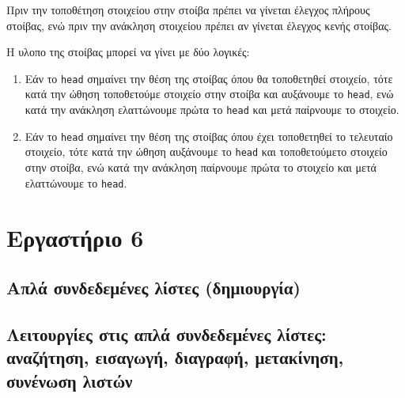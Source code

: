 \documentclass[14pt, fleqn, leqno]{extreport}
\begin{document}
Πριν την τοποθέτηση στοιχείου στην στοίβα πρέπει να γίνεται έλεγχος πλήρους στοίβας, ενώ πριν την ανάκληση στοιχείου πρέπει αν γίνεται έλεγχος κενής στοίβας.

Η υλοπο της στοίβας μπορεί να γίνει με δύο λογικές:
\begin{enumerate}
    \item Εάν το \lstinline{head} σημαίνει την θέση της στοίβας όπου θα τοποθετηθεί στοιχείο, τότε κατά την ώθηση τοποθετούμε στοιχείο στην στοίβα και αυξάνουμε το \lstinline{head}, ενώ κατά την ανάκληση ελαττώνουμε πρώτα το \lstinline{head} και μετά παίρνουμε το στοιχείο.
    \item Εάν το \lstinline{head} σημαίνει την θέση της στοίβας όπου έχει τοποθετηθεί το τελευταίο στοιχείο, τότε κατά την ώθηση αυξάνουμε το \lstinline{head} και τοποθετούμετο στοιχείο στην στοίβα, ενώ κατά την ανάκληση παίρνουμε πρώτα το στοιχείο και μετά ελαττώνουμε το \lstinline{head}.
\end{enumerate}

\chapter{Εργαστήριο 6}

\section{Απλά συνδεδεμένες λίστες (δημιουργία)}
\section{Λειτουργίες στις απλά συνδεδεμένες λίστες: αναζήτηση, εισαγωγή, διαγραφή, μετακίνηση, συνένωση λιστών}
\end{document}

